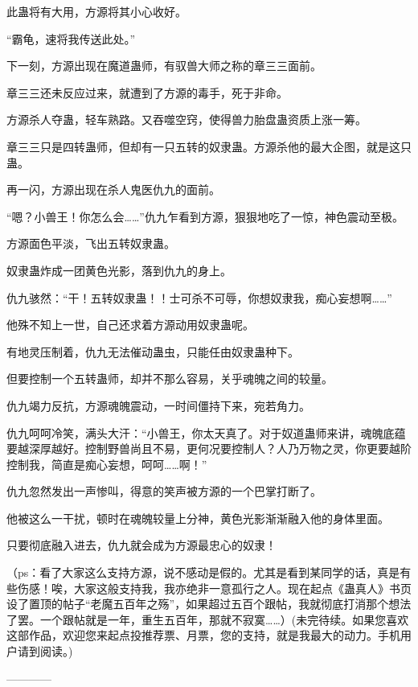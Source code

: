 \begin{this_body}
此蛊将有大用，方源将其小心收好。

“霸龟，速将我传送此处。”

下一刻，方源出现在魔道蛊师，有驭兽大师之称的章三三面前。

章三三还未反应过来，就遭到了方源的毒手，死于非命。

方源杀人夺蛊，轻车熟路。又吞噬空窍，使得兽力胎盘蛊资质上涨一筹。

章三三只是四转蛊师，但却有一只五转的奴隶蛊。方源杀他的最大企图，就是这只蛊。

再一闪，方源出现在杀人鬼医仇九的面前。

“嗯？小兽王！你怎么会……”仇九乍看到方源，狠狠地吃了一惊，神色震动至极。

方源面色平淡，飞出五转奴隶蛊。

奴隶蛊炸成一团黄色光影，落到仇九的身上。

仇九骇然：“干！五转奴隶蛊！！士可杀不可辱，你想奴隶我，痴心妄想啊……”

他殊不知上一世，自己还求着方源动用奴隶蛊呢。

有地灵压制着，仇九无法催动蛊虫，只能任由奴隶蛊种下。

但要控制一个五转蛊师，却并不那么容易，关乎魂魄之间的较量。

仇九竭力反抗，方源魂魄震动，一时间僵持下来，宛若角力。

仇九呵呵冷笑，满头大汗：“小兽王，你太天真了。对于奴道蛊师来讲，魂魄底蕴要越深厚越好。控制野兽尚且不易，更何况要控制人？人乃万物之灵，你更要越阶控制我，简直是痴心妄想，呵呵……啊！”

仇九忽然发出一声惨叫，得意的笑声被方源的一个巴掌打断了。

他被这么一干扰，顿时在魂魄较量上分神，黄色光影渐渐融入他的身体里面。

只要彻底融入进去，仇九就会成为方源最忠心的奴隶！

（ps：看了大家这么支持方源，说不感动是假的。尤其是看到某同学的话，真是有些伤感！唉，大家这般支持我，我亦绝非一意孤行之人。现在起点《蛊真人》书页设了置顶的帖子“老魔五百年之殇”，如果超过五百个跟帖，我就彻底打消那个想法了罢。一个跟帖就是一年，重生五百年，那就不寂寞……）(未完待续。如果您喜欢这部作品，欢迎您来起点投推荐票、月票，您的支持，就是我最大的动力。手机用户请到阅读。)

------------

\end{this_body}


